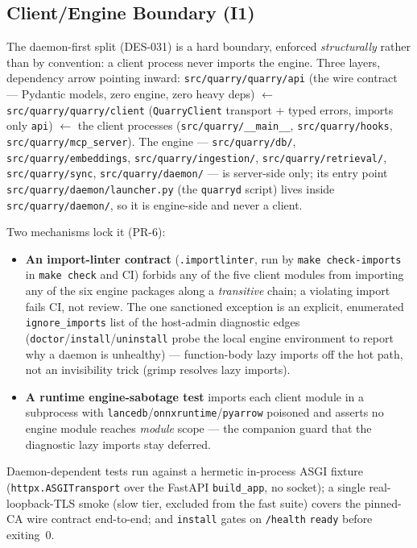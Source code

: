 \documentclass[a4paper,10pt]{article}
\newcommand{\modpath}[1]{\texttt{src/quarry/#1}}
\begin{document}
\subsection{Client/Engine Boundary (I1)}

The daemon-first split (DES-031) is a hard boundary, enforced
\emph{structurally} rather than by convention: a client process never
imports the engine.  Three layers, dependency arrow pointing inward:
\modpath{quarry/api} (the wire contract --- Pydantic models, zero engine,
zero heavy deps) $\leftarrow$ \modpath{quarry/client} (\texttt{QuarryClient}
transport + typed errors, imports only \texttt{api}) $\leftarrow$ the client
processes (\modpath{\_\_main\_\_}, \modpath{hooks}, \modpath{mcp\_server}).
The engine --- \modpath{db/}, \modpath{embeddings}, \modpath{ingestion/},
\modpath{retrieval/}, \modpath{sync}, \modpath{daemon/} --- is server-side
only; its entry point \modpath{daemon/launcher.py} (the \texttt{quarryd}
script) lives inside \modpath{daemon/}, so it is engine-side and never a
client.

Two mechanisms lock it (PR-6):

\begin{itemize}
  \item \textbf{An import-linter contract} (\texttt{.importlinter}, run by
    \texttt{make check-imports} in \texttt{make check} and CI) forbids any of
    the five client modules from importing any of the six engine packages
    along a \emph{transitive} chain; a violating import fails CI, not review.
    The one sanctioned exception is an explicit, enumerated
    \texttt{ignore\_imports} list of the host-admin diagnostic edges
    (\texttt{doctor}/\texttt{install}/\texttt{uninstall} probe the local engine
    environment to report why a daemon is unhealthy) --- function-body lazy
    imports off the hot path, not an invisibility trick (grimp resolves lazy
    imports).
  \item \textbf{A runtime engine-sabotage test} imports each client module in
    a subprocess with \texttt{lancedb}/\texttt{onnxruntime}/\texttt{pyarrow}
    poisoned and asserts no engine module reaches \emph{module} scope --- the
    companion guard that the diagnostic lazy imports stay deferred.
\end{itemize}

Daemon-dependent tests run against a hermetic in-process ASGI fixture
(\texttt{httpx.ASGITransport} over the FastAPI \texttt{build\_app}, no
socket); a single real-loopback-TLS smoke (slow tier, excluded from the fast
suite) covers the pinned-CA wire contract end-to-end; and \texttt{install}
gates on \texttt{/health} \texttt{ready} before exiting~0.
\end{document}
